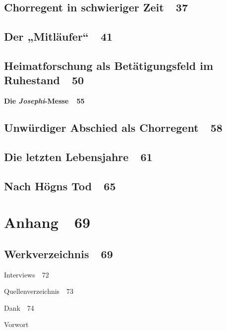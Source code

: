 \documentclass[a4paper]{article}
\begin{document}
\subsection[Chorregent in schwieriger Zeit\ \ 37]{Chorregent in
schwieriger Zeit\ \ 37}
\subsection[Der „Mitläufer“\ \ 41]{Der „Mitläufer“\ \ 41}
\subsection[Heimatforschung als Betätigungsfeld im
Ruhestand\ \ 50]{Heimatforschung als Betätigungsfeld im
Ruhestand\ \ 50}
{\bfseries
\textmd{Die }\textmd{\textit{Josephi}}\textmd{{}-Messe\ \ 55}}

\subsection[Unwürdiger Abschied als Chorregent\ \ 58]{Unwürdiger
Abschied als Chorregent\ \ 58}
\subsection[Die letzten Lebensjahre\ \ 61]{Die letzten
Lebensjahre\ \ 61}
\subsection[Nach Högns Tod\ \ 65]{Nach Högns Tod\ \ 65}
\section[Anhang\ \ 69]{Anhang\ \ 69}
\subsection[Werkverzeichnis\ \ 69]{Werkverzeichnis\ \ 69}
Interviews\ \ 72

Quellenverzeichnis\ \ 73

Dank\ \ 74

\clearpage\clearpage
Vorwort
\end{document}
